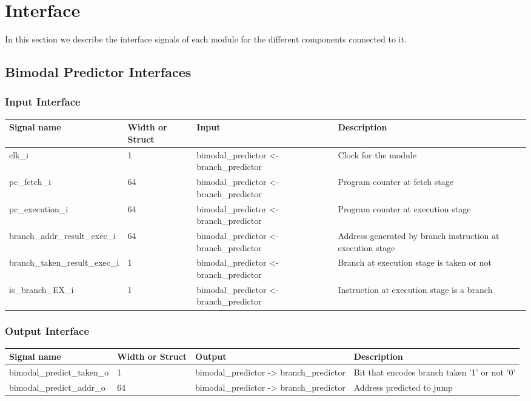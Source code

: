 \section{Interface}
\label{chapter 4}

In this section we describe the interface signals of each module for the different components connected to it.

\subsection{Bimodal Predictor Interfaces}


\subsubsection{Input Interface}

\begin{table}[H]
\centering
\begin{tabular}{l|p{1.5cm}|p{3cm}|p{4cm}}
\hline
\hline
Signal name & Width or Struct & Input & Description \\
\hline
\hline
clk\_i & 1 & bimodal\_predictor <- branch\_predictor & Clock for the module \\
\hline
pc\_fetch\_i & 64 & bimodal\_predictor <- branch\_predictor & Program counter at fetch stage \\
\hline
pc\_execution\_i & 64 & bimodal\_predictor <- branch\_predictor & Program counter at execution stage \\
\hline
branch\_addr\_result\_exec\_i & 64 & bimodal\_predictor <- branch\_predictor & Address generated by branch instruction at execution stage \\
\hline
branch\_taken\_result\_exec\_i & 1 & bimodal\_predictor <- branch\_predictor & Branch at execution stage is taken or not \\
\hline
is\_branch\_EX\_i & 1 & bimodal\_predictor <- branch\_predictor & Instruction at execution stage is a branch\\
\hline
\hline
\end{tabular}
\end{table}


\subsubsection{Output Interface}

\begin{table}[H]
\centering
\begin{tabular}{l|p{1.5cm}|p{3cm}|p{4cm}}
\hline
\hline
Signal name & Width or Struct & Output & Description \\
\hline
\hline
bimodal\_predict\_taken\_o & 1 & bimodal\_predictor -> branch\_predictor & Bit that encodes branch taken '1' or not '0'\\
\hline
bimodal\_predict\_addr\_o  & 64 & bimodal\_predictor -> branch\_predictor & Address predicted to jump \\
\hline
\hline
\end{tabular}
\end{table}

